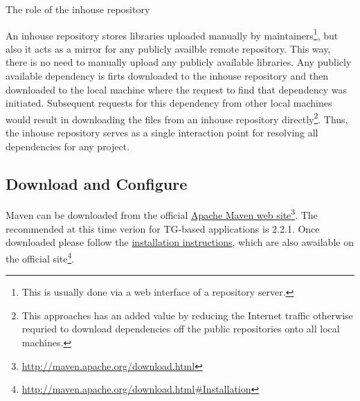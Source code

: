   \begin{image}{The role of the inhouse repository}{\label{img:ch00:01:maven_repository_structure}}    
  \end{image}

  An inhouse repository stores libraries uploaded manually by maintainers\footnote{This is usually done via a web interface of a repository server.}, but also it acts as a mirror for any publicly availble remote repository.
  This way, there is no need to manually upload any publicly available libraries.
  Any publicly available dependency is firts downloaded to the inhouse repository and then downloaded to the local machine where the request to find that dependency was initiated.
  Subsequent requests for this dependency from other local machines would result in downloading the files from an inhouse repository directly\footnote{
  This approaches has an added value by reducing the Internet traffic otherwise requried to download dependencies off the public repositories onto all local machines.
  }.  
  Thus, the inhouse repository serves as a single interaction point for resolving all dependencies for any project.
  
  \subsection*{Download and Configure} 
  Maven can be downloaded from the official \href{http://maven.apache.org/download.html}{Apache Maven web site}\footnote{\url{http://maven.apache.org/download.html}}.
  The recommended at this time verion for TG-based applications is 2.2.1.
  Once downloaded please follow the \href{http://maven.apache.org/download.html#Installation}{installation instructions}, which are also awailable on the official site\footnote{\url{http://maven.apache.org/download.html\#Installation}}.
  
